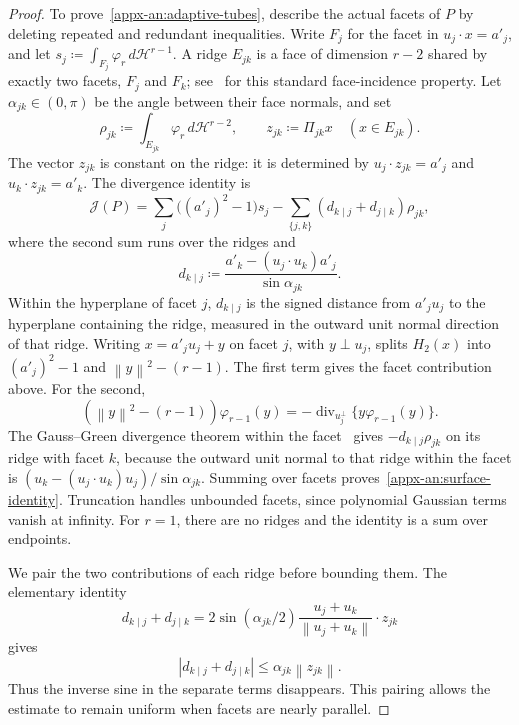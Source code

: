 \documentclass[11pt,letterpaper]{article}
\theoremstyle{remark}
\newcommand{\norm}[1]{\left\lVert#1\right\rVert}
\newcommand{\dd}{\,d}
\newcommand{\surf}{\mathcal J}
\begin{document}
\begin{proof}
To prove~\eqref{appx-an:adaptive-tubes}, describe the actual facets of
\(P\) by deleting repeated and redundant inequalities. Write \(F_j\)
for the facet in \(u_j\cdot x=a'_j\), and let
\(s_j\coloneqq \int_{F_j}\varphi_r\dd\mathcal H^{r-1}\).
A ridge \(E_{jk}\) is a face of dimension \(r-2\) shared by exactly
two facets, \(F_j\) and \(F_k\); see~\cite[Chapter~2]{Ziegler1995}
for this standard face-incidence property. Let \(\alpha_{jk}\in(0,\pi)\) be the
angle between their face normals, and set
\[
 \rho_{jk}\coloneqq \int_{E_{jk}}\varphi_r\dd\mathcal H^{r-2},\qquad
 z_{jk}\coloneqq \Pi_{jk}x\quad(x\in E_{jk}).
\]
The vector \(z_{jk}\) is constant on the ridge: it is determined by
\(u_j\cdot z_{jk}=a'_j\) and \(u_k\cdot z_{jk}=a'_k\).
The divergence identity is
\begin{equation}
 \surf(P)=\sum_j\bigl((a'_j)^2-1\bigr)s_j
       -\sum_{\{j,k\}}(d_{k\mid j}+d_{j\mid k})\rho_{jk},
 \label{appx-an:surface-identity}
\end{equation}
where the second sum runs over the ridges and
\[
 d_{k\mid j}\coloneqq \frac{a'_k-(u_j\cdot u_k)a'_j}{\sin\alpha_{jk}}.
\]
Within the hyperplane of facet \(j\), \(d_{k\mid j}\) is the signed
distance from \(a'_ju_j\) to the hyperplane containing the ridge,
measured in the outward unit normal direction of that ridge.
Writing \(x=a'_ju_j+y\) on facet \(j\), with \(y\perp u_j\),
splits \(H_2(x)\) into \((a'_j)^2-1\) and \(\norm y^2-(r-1)\).
The first term gives the facet contribution above. For the second,
\[
 (\norm y^2-(r-1))\varphi_{r-1}(y)
 =-\operatorname{div}_{u_j^\perp}\{y\varphi_{r-1}(y)\}.
\]
The Gauss--Green divergence theorem within the
facet~\cite[Chapter~5]{EvansGariepy2015} gives
\(-d_{k\mid j}\rho_{jk}\) on its ridge with facet \(k\), because
the outward unit normal to that ridge within the facet is
\((u_k-(u_j\cdot u_k)u_j)/\sin\alpha_{jk}\).
Summing over facets proves~\eqref{appx-an:surface-identity}.
Truncation handles unbounded facets, since polynomial Gaussian terms
vanish at infinity. For \(r=1\), there are no ridges and the identity
is a sum over endpoints.

We pair the two contributions of each ridge before bounding them.
The elementary identity
\[
 d_{k\mid j}+d_{j\mid k}
 =2\sin(\alpha_{jk}/2)
       \frac{u_j+u_k}{\norm{u_j+u_k}}\cdot z_{jk}
\]
gives
\begin{equation}
 |d_{k\mid j}+d_{j\mid k}|\le\alpha_{jk}\norm{z_{jk}}.
 \label{appx-an:paired-ridge-bound}
\end{equation}
Thus the inverse sine in the separate terms disappears. This pairing
allows the estimate to remain uniform when facets are nearly parallel.


\end{proof}
\end{document}
